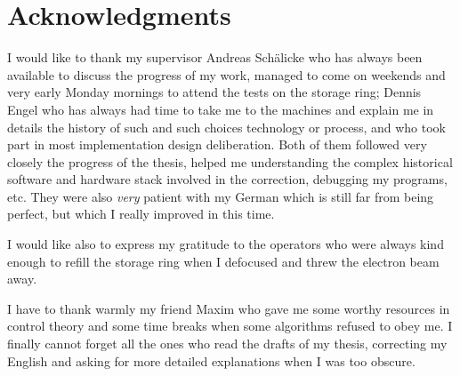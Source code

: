 
\chapter*{Acknowledgments}


I would like to thank my supervisor Andreas Schälicke who has always been available to discuss the progress of my work, managed to come on weekends and very early Monday mornings to attend the tests on the storage ring; Dennis Engel who has always had time to take me to the machines and explain me in details the history of such and such choices technology or process, and who took part in most implementation design deliberation. Both of them followed very closely the progress of the thesis, helped me understanding the complex historical software and hardware stack involved in the correction, debugging my programs, etc. They were also \textit{very} patient with my German which is still far from being perfect, but which I really improved in this time.

I would like also to express my gratitude to the operators who were always kind enough to refill the storage ring when I defocused and threw the electron beam away.

I have to thank warmly my friend Maxim who gave me some worthy resources in control theory and some time breaks when some algorithms refused to obey me. I finally cannot forget all the ones who read the drafts of my thesis, correcting my English and asking for more detailed explanations when I was too obscure.

